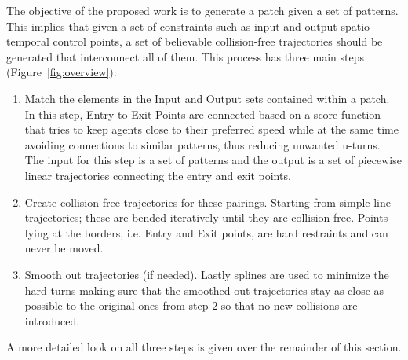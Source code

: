 The objective of the proposed work is to generate a patch given a set of patterns.
This implies that given a set of constraints such as input and output spatio-temporal control points, a set of believable collision-free trajectories should be generated that interconnect all of them.
This process has three main steps (Figure~\ref{fig:overview}):
\begin{enumerate}
  \item Match the elements in the Input and Output sets contained within a patch.
  In this step, Entry to Exit Points are connected based on a score function that tries to keep agents close to their preferred speed while at the same time avoiding connections to similar patterns, thus reducing unwanted u-turns.
  The input for this step is a set of patterns and the output is a set of piecewise linear trajectories connecting the entry and exit points.
  \item Create collision free trajectories for these pairings.
  Starting from simple line trajectories; these are bended iteratively until they are collision free.
  Points lying at the borders, i.e. Entry and Exit points, are hard restraints and can never be moved.
  \item Smooth out trajectories (if needed).
   Lastly splines are used to minimize the hard turns making sure that the smoothed out trajectories stay as close as possible to the original ones from step $2$ so that no new collisions are introduced.
\end{enumerate}

% 
% 
%       

A more detailed look on all three steps is given over the remainder of this section.

